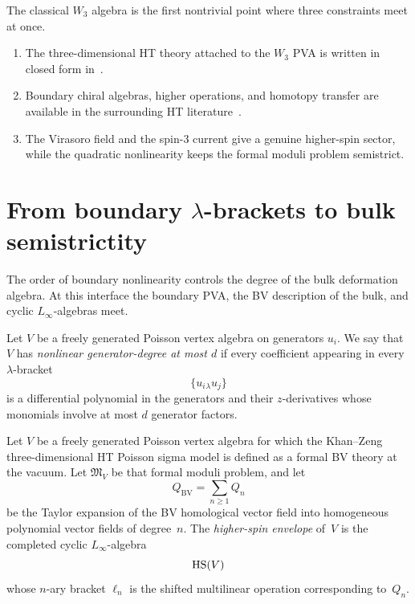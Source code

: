 \begin{remark}
\label{rem:why-W3-first}
The classical $W_3$ algebra is the first nontrivial point where three constraints meet at once.
\begin{enumerate}[label=\textup{(\alph*)}]
 \item The three-dimensional HT theory attached to the $W_3$ PVA is written in closed form in~\cite{KhanZeng25}.
 \item Boundary chiral algebras, higher operations, and homotopy transfer are available in the surrounding HT literature~\cite{CDG20,Zeng23,GKW24}.
 \item The Virasoro field and the spin-$3$ current give a genuine higher-spin sector, while the quadratic nonlinearity keeps the formal moduli problem semistrict.
\end{enumerate}
\end{remark}

\section{From boundary \texorpdfstring{$\lambda$}{lambda}-brackets to bulk semistrictity}
\label{sec:boundary-to-bulk-semistrictity}

The order of boundary nonlinearity controls the degree of the bulk deformation algebra. At this interface the boundary PVA, the BV description of the bulk, and cyclic $L_\infty$-algebras meet.

\begin{definition}
\label{def:nonlinear-generator-degree-chapter}
Let $V$ be a freely generated Poisson vertex algebra on generators $u_i$. We say that $V$ has \emph{nonlinear generator-degree at most $d$} if every coefficient appearing in every $\lambda$-bracket
\[
\{u_i{}_{\lambda}u_j\}
\]
is a differential polynomial in the generators and their $z$-derivatives whose monomials involve at most $d$ generator factors.
\end{definition}

\begin{definition}
\label{def:higher-spin-envelope-chapter}
Let $V$ be a freely generated Poisson vertex algebra for which the
Khan--Zeng three-dimensional HT Poisson sigma model is defined as a
formal BV theory at the vacuum. Let $\mathfrak M_V$ be that formal
moduli problem, and let
\[
Q_{\mathrm{BV}}=\sum_{n\ge 1}Q_n
\]
be the Taylor expansion of the BV homological vector field into homogeneous polynomial vector fields of degree~$n$. The \emph{higher-spin envelope} of~$V$ is the completed cyclic $L_\infty$-algebra
\[
\operatorname{HS}(V)
\]
whose $n$-ary bracket $\ell_n$ is the shifted multilinear operation corresponding to~$Q_n$.
\end{definition}

